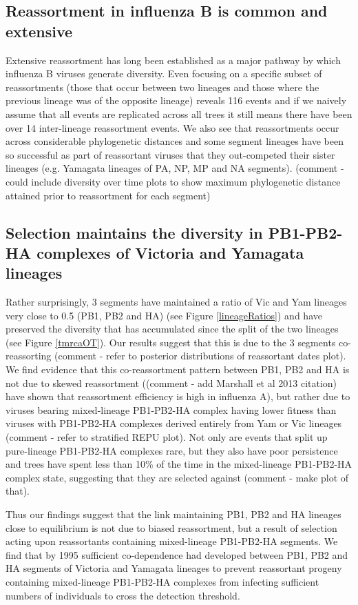 \documentclass[11pt,oneside,letterpaper]{article}
\begin{document}
\subsection*{Reassortment in influenza B is common and extensive}
Extensive reassortment has long been established as a major pathway by which influenza B viruses generate diversity.
Even focusing on a specific subset of reassortments (those that occur between two lineages and those where the previous lineage was of the opposite lineage) reveals 116 events and if we naively assume that all events are replicated across all trees it still means there have been over 14 inter-lineage reassortment events.
We also see that reassortments occur across considerable phylogenetic distances and some segment lineages have been so successful as part of reassortant viruses that they out-competed their sister lineages (e.g. Yamagata lineages of PA, NP, MP and NA segments). (comment - could include diversity over time plots to show maximum phylogenetic distance attained prior to reassortment for each segment)


\subsection*{Selection maintains the diversity in PB1-PB2-HA complexes of Victoria and Yamagata lineages}
Rather surprisingly, 3 segments have maintained a ratio of Vic and Yam lineages very close to 0.5 (PB1, PB2 and HA) (see Figure \ref{lineageRatios}) and have preserved the diversity that has accumulated since the split of the two lineages (see Figure \ref{tmrcaOT}).
Our results suggest that this is due to the 3 segments co-reassorting (comment - refer to posterior distributions of reassortant dates plot).
We find evidence that this co-reassortment pattern between PB1, PB2 and HA is not due to skewed reassortment ((comment - add Marshall et al 2013 citation) have shown that reassortment efficiency is high in influenza A), but rather due to viruses bearing mixed-lineage PB1-PB2-HA complex having lower fitness than viruses with PB1-PB2-HA complexes derived entirely from Yam or Vic lineages (comment - refer to stratified REPU plot).
Not only are events that split up pure-lineage PB1-PB2-HA complexes rare, but they also have poor persistence and trees have spent less than 10\% of the time in the mixed-lineage PB1-PB2-HA complex state, suggesting that they are selected against (comment - make plot of that).

Thus our findings suggest that the link maintaining PB1, PB2 and HA lineages close to equilibrium is not due to biased reassortment, but a result of selection acting upon reassortants containing mixed-lineage PB1-PB2-HA segments.
We find that by 1995 sufficient co-dependence had developed between PB1, PB2 and HA segments of Victoria and Yamagata lineages to prevent reassortant progeny containing mixed-lineage PB1-PB2-HA complexes from infecting sufficient numbers of individuals to cross the detection threshold.
\end{document}

